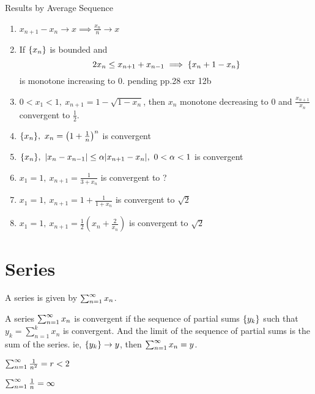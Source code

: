 	\begin{remark}Results by Average Sequence\\
		\begin{enumerate}
			\item $x_{n+1}-x_n \to x \implies \frac{x_n}{n} \to x$
			\item If $\sequence{x_n}$ is bounded and $$2x_n \le x_{n+1}+x_{n-1} \implies \sequence{x_n+1 - x_n}$$ is monotone increasing to 0. pending pp.28 exr 12b\cite{alip2}
			\item $ 0 < x_1 < 1,\ x_{n+1} = 1-\sqrt{1-x_n}$, then $x_n$ monotone decreasing to 0 and $\frac{x_{n+1}}{x_n}$ convergent to $\frac{1}{2}$.
			\item $\sequence{x_n},\ x_n = \left( 1 + \frac{1}{n} \right)^n$ is convergent
			\item $\sequence{x_n},\ |x_n-x_{n-1}| \le \alpha |x_{n+1}-x_n|,\ 0 < \alpha < 1$ is convergent
			\item $x_1 = 1,\ x_{n+1} = \frac{1}{3+x_n}$ is convergent to ?
			\item $x_1 = 1,\ x_{n+1} = 1+ \frac{1}{1+x_n}$ is convergent to $\sqrt{2}$
			\item $x_1 = 1,\ x_{n+1} = \frac{1}{2} \left( x_n + \frac{2}{x_n} \right)$ is convergent to $\sqrt{2}$
		\end{enumerate}
	\end{remark}

\section{Series}
	\begin{definition}[series]
		A series is given by $\series{x_n}{n}$.
	\end{definition}

	\begin{definition}[convergence]
		A series $\series{x_n}{n}$ is convergent if the sequence of partial sums $\sequence{y_k}$ such that $y_k = \sum_{n=1}^k x_n$ is convergent. And the limit of the sequence of partial sums is the sum of the series. ie, $\sequence{y_k} \to y$, then $\series{x_n}{n} = y$.
	\end{definition}

	\begin{remark}
		$\series{\frac{1}{n^2}}{n} = r < 2$
	\end{remark}

	\begin{remark}
		$\series{\frac{1}{n}}{n} = \infty$
	\end{remark}

